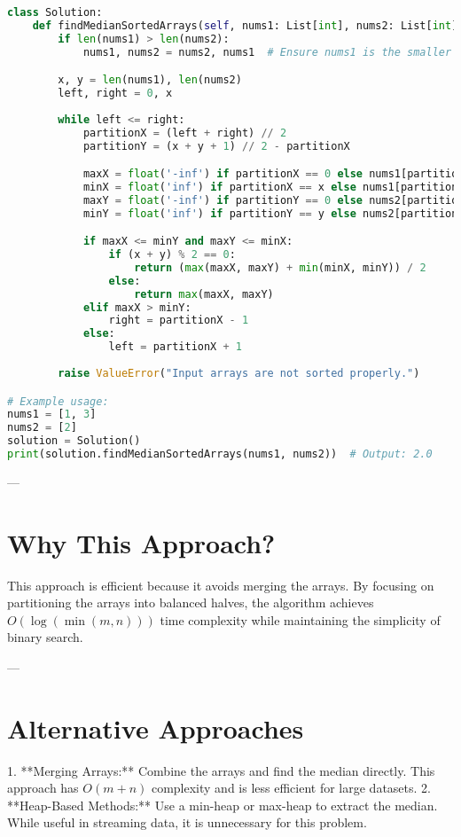 \begin{fullwidth}
\begin{lstlisting}[language=Python]
class Solution:
    def findMedianSortedArrays(self, nums1: List[int], nums2: List[int]) -> float:
        if len(nums1) > len(nums2):
            nums1, nums2 = nums2, nums1  # Ensure nums1 is the smaller array

        x, y = len(nums1), len(nums2)
        left, right = 0, x
        
        while left <= right:
            partitionX = (left + right) // 2
            partitionY = (x + y + 1) // 2 - partitionX

            maxX = float('-inf') if partitionX == 0 else nums1[partitionX - 1]
            minX = float('inf') if partitionX == x else nums1[partitionX]
            maxY = float('-inf') if partitionY == 0 else nums2[partitionY - 1]
            minY = float('inf') if partitionY == y else nums2[partitionY]

            if maxX <= minY and maxY <= minX:
                if (x + y) % 2 == 0:
                    return (max(maxX, maxY) + min(minX, minY)) / 2
                else:
                    return max(maxX, maxY)
            elif maxX > minY:
                right = partitionX - 1
            else:
                left = partitionX + 1
        
        raise ValueError("Input arrays are not sorted properly.")

# Example usage:
nums1 = [1, 3]
nums2 = [2]
solution = Solution()
print(solution.findMedianSortedArrays(nums1, nums2))  # Output: 2.0
\end{lstlisting}
\end{fullwidth}

---

\section*{Why This Approach?}
This approach is efficient because it avoids merging the arrays. By focusing on partitioning the arrays into balanced halves, the algorithm achieves \(O(\log(\min(m, n)))\) time complexity while maintaining the simplicity of binary search.

---

\section*{Alternative Approaches}
1. **Merging Arrays:** Combine the arrays and find the median directly. This approach has \(O(m + n)\) complexity and is less efficient for large datasets.
2. **Heap-Based Methods:** Use a min-heap or max-heap to extract the median. While useful in streaming data, it is unnecessary for this problem.

